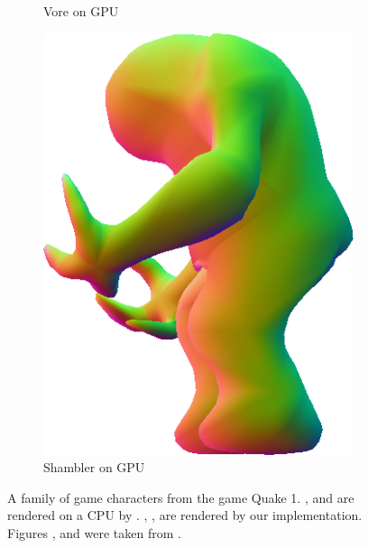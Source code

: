 \begin{figure}
\begin{subfigure}[b]{0.2\textwidth}
		\caption{Vore on GPU}
		\label{fig:results:cpugpu:gpuVore}
	\end{subfigure}	
	\hspace{0.1\textwidth}
	\begin{subfigure}[b]{0.2\textwidth}
		\centering
		\includegraphics[width=\textwidth]{content/img/results/shamblerGPU.png}
		\caption{Shambler on GPU}
		\label{fig:results:cpugpu:gpuShambler}
	\end{subfigure}			
	\caption{A family of game characters from the game Quake 1. ,  and  are rendered on a CPU by \citeauthor{vlachos2001curved}. , ,  are rendered by our implementation. Figures ,  and  were taken from \textcite{vlachos2001curved}.}
	\label{fig:results:cpugpu}
\end{figure}